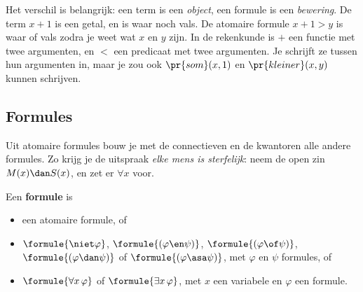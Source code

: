 Het verschil is belangrijk: een term is een \textit{object}, een formule is een \textit{bewering}. De term $x + 1$ is een getal, en is waar noch vals. De atomaire formule $x + 1 > y$ is waar of vals zodra je weet wat $x$ en $y$ zijn. In de rekenkunde is $+$ een functie met twee argumenten, en $<$ een predicaat met twee argumenten. Je schrijft ze tussen hun argumenten in, maar je zou ook $\pr{som}(x, 1)$ en $\pr{kleiner}(x, y)$ kunnen schrijven.


\begin{oefeningen}
\end{oefeningen}

\subsection{Formules}

Uit atomaire formules bouw je met de connectieven en de kwantoren alle andere formules. Zo krijg je de uitspraak \textit{elke mens is sterfelijk}: neem de open zin $M(x) \dan S(x)$, en zet er $\forall x$ voor.

\begin{theorie}
Een \textbf{\textcolor{accent}{formule}} is
\begin{itemize}[leftmargin=6mm,itemsep=.5mm]
\item een atomaire formule, of
\item $\formule{\niet\varphi}$, $\formule{(\varphi \en \psi)}$, $\formule{(\varphi \of \psi)}$, $\formule{(\varphi \dan \psi)}$ of $\formule{(\varphi \asa \psi)}$, met $\varphi$ en $\psi$ formules, of
\item $\formule{\forall x\, \varphi}$ of $\formule{\exists x\, \varphi}$, met $x$ een variabele en $\varphi$ een formule.
\end{itemize}
\end{theorie}

